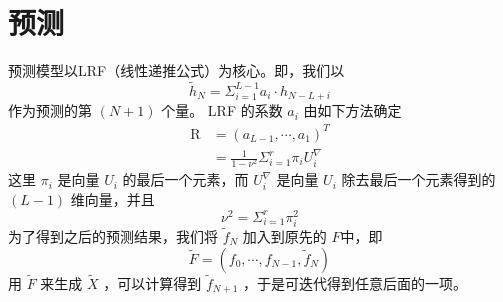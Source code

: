 \documentclass[a4paper]{article}
\begin{document}
\section{预测}
预测模型以LRF（线性递推公式）为核心。即，我们以
\begin{equation}
	\label{eqn:ssa_prediction}
	\tilde{h}_N = \Sigma_{i=1}^{L-1} a_i \cdot h_{N-L+i} 
\end{equation}
作为预测的第 $(N+1)$ 个量。 LRF 的系数 $a_i$ 由如下方法确定
\begin{align}
	\textrm{R} &= (a_{L-1}, \cdots, a_1)^T \\
	           &= \frac{1}{1-\nu^2} \Sigma_{i=1}^r \pi_i U_i^\nabla \label{eqn:R_a}
\end{align}
这里 $\pi_i$ 是向量 $U_i$ 的最后一个元素，而 $U_i^\nabla$ 是向量 $U_i$ 除去最后一个元素得到的 $(L-1)$ 维向量，并且
\begin{equation}
	\label{eqn:ssa_nu^2}
	\nu^2 = \Sigma_{i=1}^r \pi_i^2
\end{equation}
为了得到之后的预测结果，我们将 $\tilde{f}_N$ 加入到原先的 $F$中，即
\begin{equation}
	\label{eqn:ssa_new_f}
	\tilde{F} = (f_0, \cdots, f_{N-1}, \tilde{f}_N)
\end{equation}
用 $\tilde{F}$ 来生成 $\tilde{X}$ ，可以计算得到 $\tilde{f}_{N+1}$ ，于是可迭代得到任意后面的一项。
\end{document}
